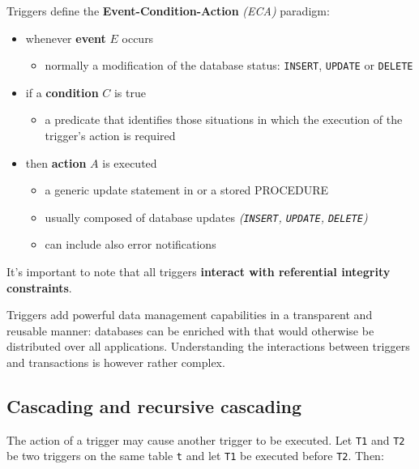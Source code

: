 \documentclass[english]{article}
\begin{document}
Triggers define the \textbf{Event-Condition-Action} \textit{(ECA)} paradigm:

\begin{itemize}
  \item whenever \textbf{event} \(E\) occurs
        \begin{itemize}[label=\(\rightarrow\)]
          \item normally a modification of the database status: \texttt{INSERT}, \texttt{UPDATE} or \texttt{DELETE}
        \end{itemize}
  \item if a \textbf{condition} \(C\) is true
        \begin{itemize}
          \item a predicate that identifies those situations in which the execution of the trigger's action is required
        \end{itemize}
  \item then \textbf{action} \(A\) is executed
        \begin{itemize}[label=\(\rightarrow\)]
          \item a generic update statement in or a stored PROCEDURE
          \item usually composed of database updates \textit{(\texttt{INSERT}, \texttt{UPDATE}, \texttt{DELETE})}
          \item can include also error notifications
        \end{itemize}
\end{itemize}

It's important to note that all triggers \textbf{interact with referential integrity constraints}.

\bigskip
Triggers add powerful data management capabilities in a transparent and reusable manner:
databases can be enriched with  that would otherwise be distributed over all applications.
Understanding the interactions between triggers and transactions is however rather complex.

\subsection{Cascading and recursive cascading}

The action of a trigger may cause another trigger to be executed.
Let \texttt{T1} and \texttt{T2} be two triggers on the same table \texttt{t} and let \texttt{T1} be executed before \texttt{T2}.
Then:
\end{document}
